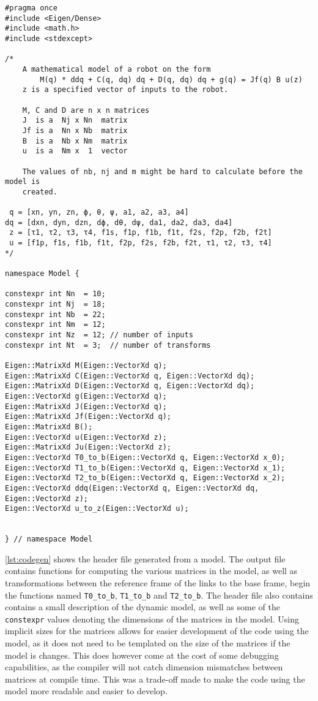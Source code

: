 \begin{lstlisting}[style=customcpp,
    caption={Automatically generated C++ code from a model.},
    label={lst:codegen}]
#pragma once
#include <Eigen/Dense>
#include <math.h>
#include <stdexcept>

/*
    A mathematical model of a robot on the form
        M(q) * ddq + C(q, dq) dq + D(q, dq) dq + g(q) = Jf(q) B u(z)
    z is a specified vector of inputs to the robot.

    M, C and D are n x n matrices
    J  is a  Nj x Nn  matrix
    Jf is a  Nn x Nb  matrix
    B  is a  Nb x Nm  matrix
    u  is a  Nm x  1  vector

    The values of nb, nj and m might be hard to calculate before the model is
    created.
    
 q = [xn, yn, zn, ϕ, θ, ψ, a1, a2, a3, a4]
dq = [dxn, dyn, dzn, dϕ, dθ, dψ, da1, da2, da3, da4]
 z = [τ1, τ2, τ3, τ4, f1s, f1p, f1b, f1t, f2s, f2p, f2b, f2t]
 u = [f1p, f1s, f1b, f1t, f2p, f2s, f2b, f2t, τ1, τ2, τ3, τ4]
*/

namespace Model {

constexpr int Nn  = 10;
constexpr int Nj  = 18;
constexpr int Nb  = 22;
constexpr int Nm  = 12;
constexpr int Nz  = 12; // number of inputs
constexpr int Nt  = 3;  // number of transforms

Eigen::MatrixXd M(Eigen::VectorXd q);
Eigen::MatrixXd C(Eigen::VectorXd q, Eigen::VectorXd dq);
Eigen::MatrixXd D(Eigen::VectorXd q, Eigen::VectorXd dq);
Eigen::VectorXd g(Eigen::VectorXd q);
Eigen::MatrixXd J(Eigen::VectorXd q);
Eigen::MatrixXd Jf(Eigen::VectorXd q);
Eigen::MatrixXd B();
Eigen::VectorXd u(Eigen::VectorXd z);
Eigen::MatrixXd Ju(Eigen::VectorXd z);
Eigen::VectorXd T0_to_b(Eigen::VectorXd q, Eigen::VectorXd x_0);
Eigen::VectorXd T1_to_b(Eigen::VectorXd q, Eigen::VectorXd x_1);
Eigen::VectorXd T2_to_b(Eigen::VectorXd q, Eigen::VectorXd x_2);
Eigen::VectorXd ddq(Eigen::VectorXd q, Eigen::VectorXd dq, Eigen::VectorXd z);
Eigen::VectorXd u_to_z(Eigen::VectorXd u);


} // namespace Model
\end{lstlisting}

\autoref{lst:codegen} shows the header file generated from a model. The output
file contains functions for computing the various matrices in the model, as well
as transformations between the reference frame of the links to the base frame,
begin the functions named \texttt{T0\_to\_b}, \texttt{T1\_to\_b} and \texttt{T2\_to\_b}.
The header file also contains contains a small description of the dynamic model,
as well as some of the \texttt{constexpr} values denoting the dimensions of the
matrices in the model. Using implicit sizes for the matrices allows for easier
development of the code using the model, as it does not need to be templated on
the size of the matrices if the model is changes. This does however come at the
cost of some debugging capabilities, as the compiler will not catch dimension
mismatches between matrices at compile time. This was a trade-off made to make
the code using the model more readable and easier to develop.

